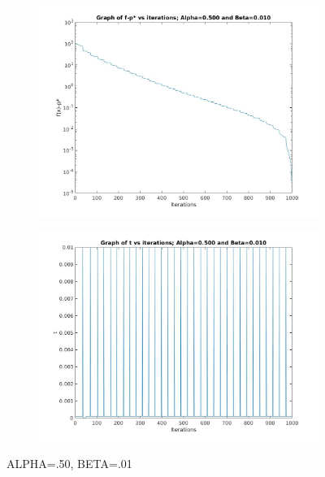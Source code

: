 \documentclass[12pt]{article}
\begin{document}
\begin{figure}[ht]
    \centering
    \begin{subfigure}{0.4\textwidth} %
        \includegraphics[width=\textwidth]{f_alpha_50_beta_01.jpg}
    \end{subfigure}
    \vspace{1em} %
    \begin{subfigure}{0.4\textwidth} %
        \includegraphics[width=\textwidth]{t_alpha_50_beta_01.jpg}
    \end{subfigure}
    \caption{ALPHA=.50, BETA=.01} %
\end{figure}
\end{document}
